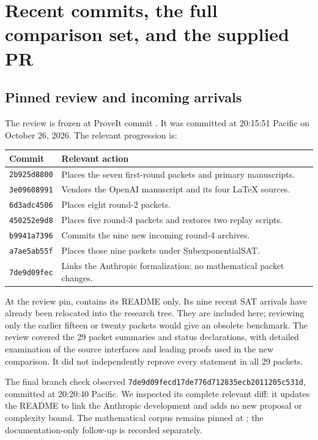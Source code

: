 \section{Recent commits, the full comparison set, and the supplied PR}
\label{sec:review}

\subsection{Pinned review and incoming arrivals}
The review is frozen at ProveIt commit \pin. It was committed at
20:15:51 Pacific on October 26, 2026. The relevant progression is:
\begin{center}\small
\begin{tabular}{p{3.5cm}p{10.5cm}}
\toprule
Commit & Relevant action\\\midrule
\texttt{2b925d8800} & Places the seven first-round packets and primary manuscripts.\\
\texttt{3e09608991} & Vendors the OpenAI manuscript and its four LaTeX sources.\\
\texttt{6d3adc4506} & Places eight round-2 packets.\\
\texttt{450252e9d8} & Places five round-3 packets and restores two replay scripts.\\
\texttt{b9941a7396} & Commits the nine new incoming round-4 archives.\\
\texttt{a7ae5ab55f} & Places those nine packets under SubexponentialSAT.\\
\texttt{7de9d09fec} & Links the Anthropic formalization; no mathematical packet changes.\\
\bottomrule
\end{tabular}
\end{center}
At the review pin,  contains its README only. Its nine
recent SAT arrivals have already been relocated into the research tree.
They are included here; reviewing only the earlier fifteen or twenty packets
would give an obsolete benchmark. The review covered the 29 packet summaries
and status declarations, with detailed examination of the source interfaces
and leading proofs used in the new comparison. It did not independently
reprove every statement in all 29 packets.

The final branch check observed \texttt{7de9d09fecd17de776d712835ecb2011205c531d},
committed at 20:20:40 Pacific. We inspected its complete relevant diff:
it updates the README to link the Anthropic development and adds no
new proposal or complexity bound. The mathematical corpus remains pinned
at \pin; the documentation-only follow-up is recorded separately.

